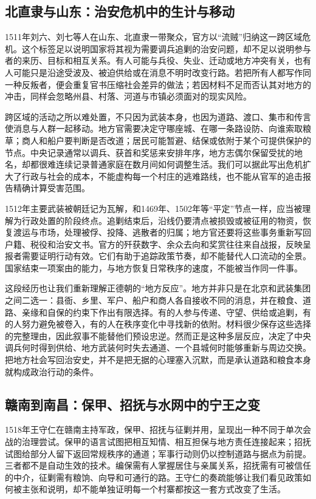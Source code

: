 \subsection{北直隶与山东：治安危机中的生计与移动}

1511年刘六、刘七等人在山东、北直隶一带聚众，官方以“流贼”归纳这一跨区域危机。这个标签足以说明国家将其视为需要调兵追剿的治安问题，却不足以说明参与者的来历、目标和相互关系。有人可能与兵役、失业、迁动或地方冲突有关，也有人可能只是沿途受波及、被迫供给或在消息不明时改变行路。若把所有人都写作同一种反叛者，便会重复官书压缩社会差异的做法；若因材料不足而否认其对地方的冲击，同样会忽略州县、村落、河道与市镇必须面对的现实风险。

跨区域的活动之所以难处置，不只因为武装本身，也因为道路、渡口、集市和传言使消息与人群一起移动。地方官需要决定守哪座城、在哪一条路设防、向谁索取粮草；商人和船户要判断是否改道；居民可能暂避、结保或依附于某个可提供保护的节点。中央记录通常以调兵、获首和奖惩来安排年序，地方志偶尔保留受扰的地名，却都很难连续记录普通家庭在数月间如何调整生活。我们可以据此写出危机扩大了行政与社会的成本，不能虚构每一个村庄的逃难路线，也不能从官军的追击报告精确计算受害范围。

1512年主要武装被朝廷记为瓦解，和1469年、1502年等“平定”节点一样，应当被理解为行政处置的阶段终点。追剿结束后，沿线仍要清点被损毁或被征用的物资，恢复渡运与市场，处理被俘、投降、逃散者的归属；地方官还要将这些事务重新写回户籍、税役和治安文书。官方的歼获数字、余众去向和奖赏往往来自战报，反映呈报者需要证明行动有效。它们有助于追踪政策节奏，却不能替代人口流动的全景。国家结束一项案由的能力，与地方恢复日常秩序的速度，不能被当作同一件事。

这段经历也让我们重新理解正德朝的“地方反应”。地方并非只是在北京和武装集团之间二选一：县衙、乡里、军户、船户和商人各自接收不同的消息，并在粮食、道路、亲缘和自保的约束下作出有限选择。有的人参与传递、守望、供给或追剿，有的人努力避免被卷入，有的人在秩序变化中寻找新的依附。材料很少保存这些选择的完整理由，因此叙事不能替他们预设忠逆。然而正是这种多层反应，决定了中央调兵何时得到供给、地方武装何时失去通道、一个县城何时能够重新与周边交换。把地方社会写回治安史，并不是把无据的心理塞入沉默，而是承认道路和粮食本身就构成政治行动的条件。

\subsection{赣南到南昌：保甲、招抚与水网中的宁王之变}

1518年王守仁在赣南主持军政，保甲、招抚与征剿并用，呈现出一种不同于单次会战的治理尝试。保甲的语言试图把相互知情、相互担保与地方责任连接起来；招抚试图给部分人留下返回常规秩序的通道；军事行动则仍以控制道路与据点为前提。三者都不是自动生效的技术。编保需有人掌握居住与亲属关系，招抚需有可被信任的中介，征剿需有粮饷、向导和可通行的路。王守仁的奏疏能够让我们看见政策如何被主张和说明，却不能单独证明每一个村寨都按这一套方式改变了生活。

